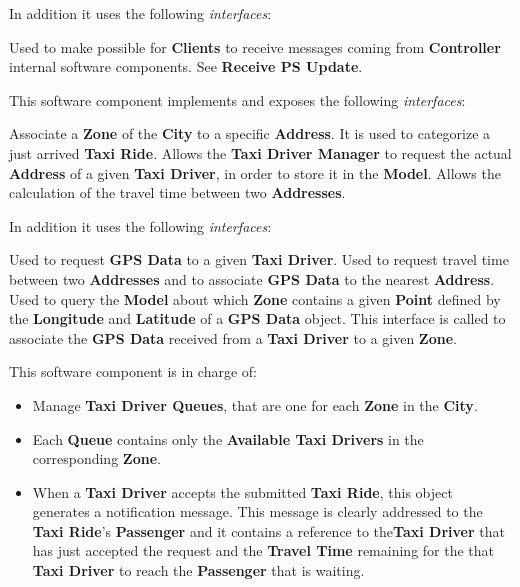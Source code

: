 \begin{itemize}
\begin{itemize}
\begin{itemize}
		\end{itemize}
			In addition it uses the following \textit{interfaces}:
		\begin{itemize}
			 Used to make possible for \textbf{Clients} to receive messages coming from \textbf{Controller} internal software components.
			 See \textbf{Receive PS Update}.	
		\end{itemize}
		\itemBold{Location Manager}
		This software component implements and exposes the following \textit{interfaces}:
		\begin{itemize}
			 Associate a \textbf{Zone} of the \textbf{City} to a specific \textbf{Address}. It is used to categorize a just arrived \textbf{Taxi Ride}.
			 Allows the \textbf{Taxi Driver Manager} to request the actual \textbf{Address} of a given \textbf{Taxi Driver}, in order to store it in the \textbf{Model}.
			 Allows the calculation of the travel time between two \textbf{Addresses}.
		\end{itemize}
		In addition it uses the following \textit{interfaces}:
		\begin{itemize}
			 Used to request \textbf{GPS Data} to a given \textbf{Taxi Driver}.
			 Used to request travel time between two \textbf{Addresses} and to associate \textbf{GPS Data} to the nearest \textbf{Address}.
			 Used to query the \textbf{Model} about which \textbf{Zone} contains a given \textbf{Point} defined by the \textbf{Longitude} and \textbf{Latitude} of a \textbf{GPS Data} object.
			This interface is called to associate the \textbf{GPS Data} received from a \textbf{Taxi Driver} to a given \textbf{Zone}.
		\end{itemize}
		 This software component is in charge of:
		\begin{itemize}
			\item Manage \textbf{Taxi Driver Queues}, that are one for each \textbf{Zone} in the \textbf{City}.
			\item Each \textbf{Queue} contains only the \textbf{Available Taxi Drivers} in the corresponding \textbf{Zone}.
			\item When a \textbf{Taxi Driver} accepts the submitted \textbf{Taxi Ride}, this object generates a notification message. This message is clearly addressed to the \textbf{Taxi Ride}'s \textbf{Passenger} and it contains a reference to the\textbf{Taxi Driver} that has just accepted the request and the \textbf{Travel Time} remaining for the that \textbf{Taxi Driver} to reach the \textbf{Passenger} that is waiting.

\end{itemize}
\end{itemize}
\end{itemize}
